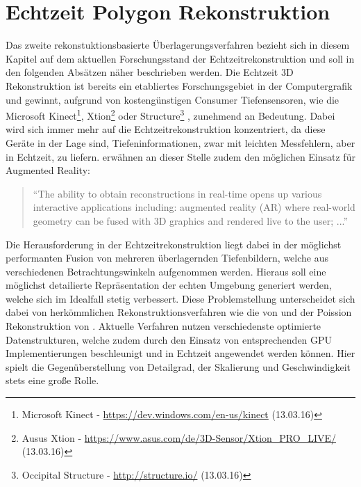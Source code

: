 \section{Echtzeit Polygon Rekonstruktion} \label{sec:polygon_reconstruction}

Das zweite rekonstuktionsbasierte Überlagerungsverfahren bezieht sich in diesem Kapitel auf dem aktuellen Forschungsstand der Echtzeitrekonstruktion und soll in den folgenden Absätzen näher beschrieben werden. Die Echtzeit 3D Rekonstruktion ist bereits ein etabliertes Forschungsgebiet in der Computergrafik und gewinnt, aufgrund von kostengünstigen Consumer Tiefensensoren, wie die Microsoft Kinect\footnote{Microsoft Kinect - \url{https://dev.windows.com/en-us/kinect} (13.03.16)}, Xtion\footnote{Ausus Xtion - \url{https://www.asus.com/de/3D-Sensor/Xtion_PRO_LIVE/} (13.03.16)} oder Structure\footnote{Occipital Structure - \url{http://structure.io/} (13.03.16)} , zunehmend an Bedeutung. Dabei wird sich immer mehr auf die Echtzeitrekonstruktion konzentriert, da diese Geräte in der Lage sind, Tiefeninformationen, zwar mit leichten Messfehlern, aber in Echtzeit, zu liefern. \citet{niessner2013real} erwähnen an dieser Stelle zudem den möglichen Einsatz für Augmented Reality:

\begin{quote}
\enquote{The ability to obtain reconstructions
in real-time opens up various interactive applications including:
augmented reality (AR) where real-world geometry can be fused
with 3D graphics and rendered live to the user; ...} \citep{niessner2013real}
\end{quote}

Die Herausforderung in der Echtzeitrekonstruktion liegt dabei in der möglichst performanten Fusion von mehreren überlagernden Tiefenbildern, welche aus verschiedenen Betrachtungswinkeln aufgenommen werden. Hieraus soll eine möglichst detailierte Repräsentation der echten Umgebung generiert werden, welche sich im Idealfall stetig verbessert. Diese Problemstellung unterscheidet sich dabei von herkömmlichen Rekonstruktionsverfahren wie die von \citet{hoppe1992surface} und der Poission Rekonstruktion von \citet{kazhdan2006poisson}. Aktuelle Verfahren nutzen verschiedenste optimierte Datenstrukturen, welche zudem durch den Einsatz von entsprechenden GPU Implementierungen beschleunigt und in Echtzeit angewendet werden können. Hier spielt die Gegenüberstellung von Detailgrad, der Skalierung und Geschwindigkeit stets eine große Rolle. \citep{niessner2013real} 

